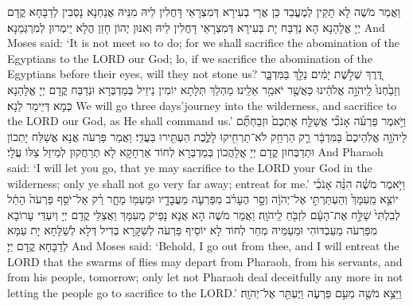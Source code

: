 {{}
{וַאֲמַר מֹשֶׁה לָא תָקֵין לְמֶעֱבַד כֵּן אֲרֵי בְעִירָא דְּמִצְרָאֵי דָּחֲלִין לֵיהּ מִנֵּיהּ אֲנַחְנָא נָסְבִין לְדַבָּחָא קֳדָם יְיָ אֱלָהַנָא הָא נְדַבַּח יָת בְּעִירָא דְּמִצְרָאֵי דָּחֲלִין לֵיהּ וְאִנּוּן יְהוֹן חָזַן הֲלָא יֵימְרוּן לְמִרְגְּמַנָא׃}
{And Moses said: ‘It is not meet so to do; for we shall sacrifice the abomination of the Egyptians to the LORD our God; lo, if we sacrifice the abomination of the Egyptians before their eyes, will they not stone us?}{}
{דֶּ֚רֶךְ שְׁלֹ֣שֶׁת יָמִ֔ים נֵלֵ֖ךְ בַּמִּדְבָּ֑ר וְזָבַ֙חְנוּ֙ לַֽיהֹוָ֣ה אֱלֹהֵ֔ינוּ כַּאֲשֶׁ֖ר יֹאמַ֥ר אֵלֵֽינוּ׃}
{מַהְלַךְ תְּלָתָא יוֹמִין נֵיזֵיל בְּמַדְבְּרָא וּנְדַבַּח קֳדָם יְיָ אֱלָהַנָא כְּמָא דְּיֵימַר לַנָא׃}
{We will go three days’journey into the wilderness, and sacrifice to the LORD our God, as He shall command us.’}{}
{וַיֹּ֣אמֶר פַּרְעֹ֗ה אָנֹכִ֞י אֲשַׁלַּ֤ח אֶתְכֶם֙ וּזְבַחְתֶּ֞ם לַיהֹוָ֤ה אֱלֹֽהֵיכֶם֙ בַּמִּדְבָּ֔ר רַ֛ק הַרְחֵ֥ק לֹא־תַרְחִ֖יקוּ לָלֶ֑כֶת הַעְתִּ֖ירוּ בַּעֲדִֽי׃}
{וַאֲמַר פַּרְעֹה אֲנָא אֲשַׁלַּח יָתְכוֹן וּתְדַבְּחוּן קֳדָם יְיָ אֱלָהֲכוֹן בְּמַדְבְּרָא לְחוֹד אַרְחָקָא לָא תְרַחֲקוּן לְמֵיזַל צַלּוֹ עֲלָי׃}
{And Pharaoh said: ‘I will let you go, that ye may sacrifice to the LORD your God in the wilderness; only ye shall not go very far away; entreat for me.’}{}
{וַיֹּ֣אמֶר מֹשֶׁ֗ה הִנֵּ֨ה אָנֹכִ֜י יוֹצֵ֤א מֵֽעִמָּךְ֙ וְהַעְתַּרְתִּ֣י אֶל־יְהֹוָ֔ה וְסָ֣ר הֶעָרֹ֗ב מִפַּרְעֹ֛ה מֵעֲבָדָ֥יו וּמֵעַמּ֖וֹ מָחָ֑ר רַ֗ק אַל־יֹסֵ֤ף פַּרְעֹה֙ הָתֵ֔ל לְבִלְתִּי֙ שַׁלַּ֣ח אֶת־הָעָ֔ם לִזְבֹּ֖חַ לַֽיהֹוָֽה׃
}
{וַאֲמַר מֹשֶׁה הָא אֲנָא נָפֵיק מֵעִמָּךְ וַאֲצַלֵּי קֳדָם יְיָ וְיִעְדֵּי עָרוֹבָא מִפַּרְעֹה מֵעַבְדּוֹהִי וּמֵעַמֵּיהּ מְחַר לְחוֹד לָא יוֹסֵיף פַּרְעֹה לְשַׁקָּרָא בְּדִיל דְּלָא לְשַׁלָּחָא יָת עַמָּא לְדַבָּחָא קֳדָם יְיָ׃}
{And Moses said: ‘Behold, I go out from thee, and I will entreat the LORD that the swarms of flies may depart from Pharaoh, from his servants, and from his people, tomorrow; only let not Pharaoh deal deceitfully any more in not letting the people go to sacrifice to the LORD.’}{}
{וַיֵּצֵ֥א מֹשֶׁ֖ה מֵעִ֣ם פַּרְעֹ֑ה וַיֶּעְתַּ֖ר אֶל־יְהֹוָֽה׃
}}

